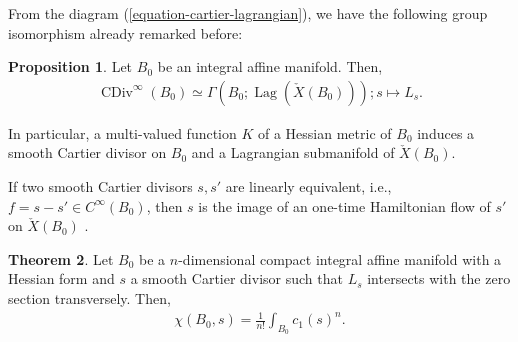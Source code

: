 \documentclass[a4paper,dvipdfmx,reqno,12pt]{amsart}
\theoremstyle{definition}
\newtheorem{theorem}{Theorem}[section]
\newtheorem{proposition}[theorem]{Proposition}
\newcommand{\opn}[1]{\operatorname{#1}}
\numberwithin{equation}{section}
\begin{document}
From the diagram (\ref{equation-cartier-lagrangian}),
we have the following group isomorphism already remarked 
before:

\begin{proposition}
\label{proposition-cartier-lagrangian}
Let $B_0$ be an integral affine manifold. Then,
\begin{align}
\opn{CDiv}^{\infty}(B_0)\simeq \Gamma(B_0;
\opn{Lag}(\check{X}(B_0)));s\mapsto L_s.
\end{align}
\end{proposition}

In particular, a multi-valued function $K$ of a Hessian 
metric of $B_0$ induces a smooth Cartier divisor on $B_0$
and a Lagrangian submanifold of $\check{X}(B_0)$.

If two smooth Cartier divisors $s,s'$ are linearly equivalent, 
i.e., $f=s-s'\in C^{\infty}(B_0)$, 
then $s$ is the image of an one-time Hamiltonian flow of $s'$
on $\check{X}(B_0)$
\cite[Exercise 6.65]{MR2567952}.


















\begin{theorem} \label{theorem-MRR-hesse}
  Let $B_0$ be a $n$-dimensional compact 
integral affine manifold with a Hessian form and
  $s$ a smooth Cartier divisor such that $L_s$ intersects 
with the zero section transversely. Then,
  \begin{align} \label{equation-Hesse-RR}
    \chi(B_0,s)=\frac{1}{n!}\int_{B_0}c_1(s)^{n}.
  \end{align}
\end{theorem}
\end{document}
